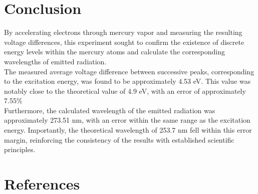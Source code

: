 \documentclass[12pt]{article}
\begin{document}
\section{Conclusion}
By accelerating electrons through mercury vapor and measuring the resulting voltage differences, 
this experiment sought to confirm the existence of discrete energy levels within the mercury atoms and calculate the corresponding wavelengths of emitted radiation.
\\
The measured average voltage difference between successive peaks, corresponding to the excitation energy, was found to be approximately 4.53 eV.
This value was notably close to the theoretical value of 4.9 eV, with an error of approximately 7.55\%
\\
Furthermore, the calculated wavelength of the emitted radiation was approximately 273.51 nm, with an error within 
the same range as the excitation energy. Importantly, the theoretical wavelength of 253.7 nm fell within this error margin, 
reinforcing the consistency of the results with established scientific principles.
\\

\section{References}
\printbibliography
\end{document}
